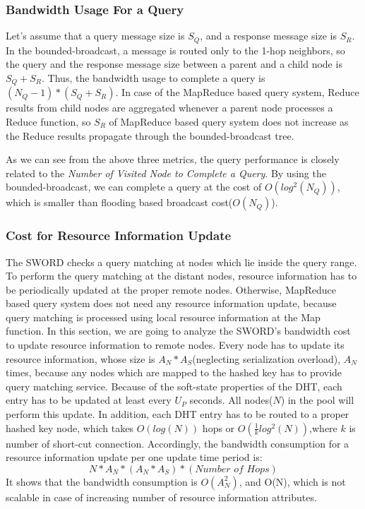 \documentclass{acm_proc_article-sp}
\begin{document}
\subsubsection{Bandwidth Usage For a Query}
Let's assume that a query message size is $S_Q$, and a response message size is $S_R$.
In the bounded-broadcast, a message is routed only to the 1-hop neighbors, so the query and the response message size between a parent and a child node is $S_Q+S_R$.
Thus, the bandwidth usage to complete a query is \begin{math}(N_Q-1)*(S_Q+S_R)\end{math}.
In case of the MapReduce based query system, Reduce results from child nodes are aggregated whenever a parent node processes a Reduce function, so $S_R$ of MapReduce based query system does not increase
as the Reduce results propagate through the bounded-broadcast tree.

As we can see from the above three metrics, the query performance is closely related to the \textit{Number of Visited Node to Complete a Query}. By using the bounded-broadcast, we can complete a query
at the cost of \begin{math}O(log^2(N_Q))\end{math}, which is smaller than flooding based broadcast cost(\begin{math}O(N_Q)\end{math}).
\subsubsection{Cost for Resource Information Update}
The SWORD checks a query matching at nodes which lie inside the query range. To perform the query matching at the distant nodes, resource information has to be periodically updated at the proper remote nodes.
Otherwise, MapReduce based query system does not need any resource information update, because query matching is processed using local resource information at the Map function.
In this section, we are going to analyze the SWORD's bandwidth cost to update resource information to remote nodes.
Every node has to update its resource information, whose size is $A_N*A_S$(neglecting serialization overload), $A_N$ times, because any nodes which are mapped to the hashed key has to provide query matching service. 
Because of the soft-state properties of the DHT, each entry has to be updated at least every $U_P$ seconds. All nodes($N$) in the pool will perform this update.
In addition, each DHT entry has to be routed to a proper hashed key node, which takes $O(log(N))$ hops\cite{chord}\cite{pastry} or \begin{math}O(\frac{1}{k}log^2(N))\end{math},where $k$ is number of short-cut connection\cite{brunet}.
Accordingly, the bandwidth consumption for a resource information update per one update time period is:
\begin{displaymath}N*A_N*(A_N*A_S)*(\textit{Number of Hops})\end{displaymath}
It shows that the bandwidth consumption is $O(A_N^2)$, and O(N), which is not scalable in case of increasing number of resource information attributes.
\end{document}
